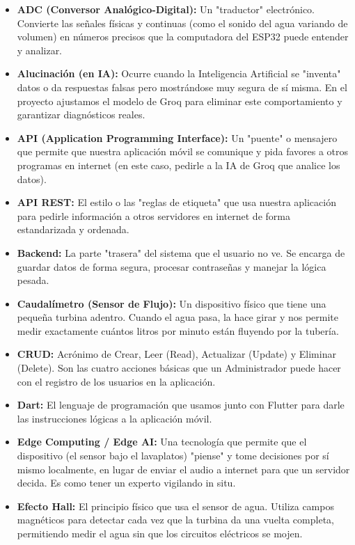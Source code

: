 \documentclass[11pt,a4paper]{article}
\begin{document}
\begin{itemize}
    \item \textbf{ADC (Conversor Analógico-Digital):} Un "traductor" electrónico. Convierte las señales físicas y continuas (como el sonido del agua variando de volumen) en números precisos que la computadora del ESP32 puede entender y analizar.
    \item \textbf{Alucinación (en IA):} Ocurre cuando la Inteligencia Artificial se "inventa" datos o da respuestas falsas pero mostrándose muy segura de sí misma. En el proyecto ajustamos el modelo de Groq para eliminar este comportamiento y garantizar diagnósticos reales.
    \item \textbf{API (Application Programming Interface):} Un "puente" o mensajero que permite que nuestra aplicación móvil se comunique y pida favores a otros programas en internet (en este caso, pedirle a la IA de Groq que analice los datos).
    \item \textbf{API REST:} El estilo o las "reglas de etiqueta" que usa nuestra aplicación para pedirle información a otros servidores en internet de forma estandarizada y ordenada.
    \item \textbf{Backend:} La parte "trasera" del sistema que el usuario no ve. Se encarga de guardar datos de forma segura, procesar contraseñas y manejar la lógica pesada.
    \item \textbf{Caudalímetro (Sensor de Flujo):} Un dispositivo físico que tiene una pequeña turbina adentro. Cuando el agua pasa, la hace girar y nos permite medir exactamente cuántos litros por minuto están fluyendo por la tubería.
    \item \textbf{CRUD:} Acrónimo de Crear, Leer (Read), Actualizar (Update) y Eliminar (Delete). Son las cuatro acciones básicas que un Administrador puede hacer con el registro de los usuarios en la aplicación.
    \item \textbf{Dart:} El lenguaje de programación que usamos junto con Flutter para darle las instrucciones lógicas a la aplicación móvil.
    \item \textbf{Edge Computing / Edge AI:} Una tecnología que permite que el dispositivo (el sensor bajo el lavaplatos) "piense" y tome decisiones por sí mismo localmente, en lugar de enviar el audio a internet para que un servidor decida. Es como tener un experto vigilando in situ.
    \item \textbf{Efecto Hall:} El principio físico que usa el sensor de agua. Utiliza campos magnéticos para detectar cada vez que la turbina da una vuelta completa, permitiendo medir el agua sin que los circuitos eléctricos se mojen.

\end{itemize}
\end{document}
